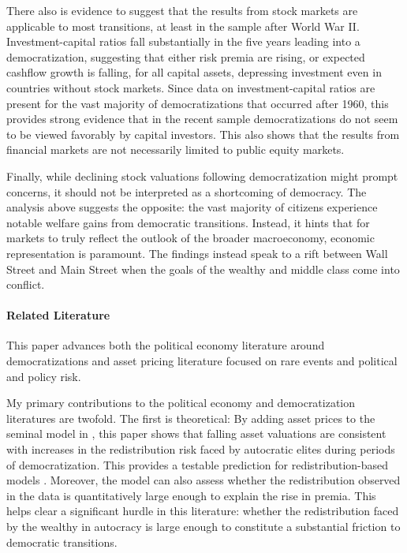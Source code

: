 \documentclass[12pt]{article}
\numberwithin{equation}{section}
\begin{document}
\label{par:ik_intro_evidence}
There also is evidence to suggest that the results from stock markets are applicable to most transitions, at least in the sample after World War II. Investment-capital ratios fall substantially in the five years leading into a democratization, suggesting that either risk premia are rising, or expected cashflow growth is falling, for all capital assets, depressing investment even in countries without stock markets. Since data on investment-capital ratios are present for the vast majority of democratizations that occurred after 1960, this provides strong evidence that in the recent sample democratizations do not seem to be viewed favorably by capital investors. This also shows that the results from financial markets are not necessarily limited to public equity markets.
\label{par:limitation_acknowledge_end}

Finally, while declining stock valuations following democratization might prompt concerns, it should not be interpreted as a shortcoming of democracy. The analysis above suggests the opposite: the vast majority of citizens experience notable welfare gains from democratic transitions. Instead, it hints that for markets to truly reflect the outlook of the broader macroeconomy, economic representation is paramount. The findings instead speak to a rift between Wall Street and Main Street when the goals of the wealthy and middle class come into conflict.

\paragraph{Related Literature}

This paper advances both the political economy literature around democratizations and asset pricing literature focused on rare events and political and policy risk.

My primary contributions to the political economy and democratization literatures are twofold. The first is theoretical: By adding asset prices to the seminal model in \cite*{Acemoglu2006}, this paper shows that falling asset valuations are consistent with increases in the redistribution risk faced by autocratic elites during periods of democratization. This provides a testable prediction for redistribution-based models \citep*{Boix2003,Acemoglu2006}. Moreover, the model can also assess whether the redistribution observed in the data is quantitatively large enough to explain the rise in premia. This helps clear a significant hurdle in this literature: whether the redistribution faced by the wealthy in autocracy is large enough to constitute a substantial friction to democratic transitions. 
\end{document}

